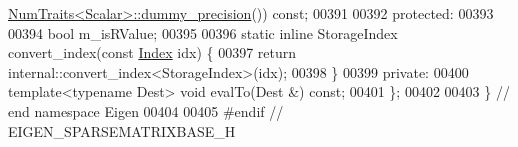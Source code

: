 \begin{DoxyCode}
      \hyperlink{group___core___module_struct_eigen_1_1_num_traits}{NumTraits<Scalar>::dummy\_precision}()) \textcolor{keyword}{const};
00391 
00392   \textcolor{keyword}{protected}:
00393 
00394     \textcolor{keywordtype}{bool} m\_isRValue;
00395 
00396     \textcolor{keyword}{static} \textcolor{keyword}{inline} StorageIndex convert\_index(\textcolor{keyword}{const} \hyperlink{group___core___module_a554f30542cc2316add4b1ea0a492ff02}{Index} idx) \{
00397       \textcolor{keywordflow}{return} internal::convert\_index<StorageIndex>(idx);
00398     \}
00399   \textcolor{keyword}{private}:
00400     \textcolor{keyword}{template}<\textcolor{keyword}{typename} Dest> \textcolor{keywordtype}{void} evalTo(Dest &) \textcolor{keyword}{const};
00401 \};
00402 
00403 \} \textcolor{comment}{// end namespace Eigen}
00404 
00405 \textcolor{preprocessor}{#endif // EIGEN\_SPARSEMATRIXBASE\_H}
\end{DoxyCode}
